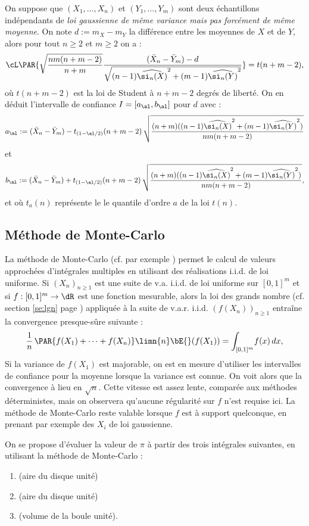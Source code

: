 On suppose que $(X_1,\ldots,X_n)$ et $(Y_1,\ldots,Y_m)$ sont deux échantillons
indépendants de \emph{loi gaussienne de même variance mais pas forcément de
  même moyenne}. On note $d:=m_X-m_Y$ la différence entre les moyennes de $X$
et de $Y$, alors pour tout $n \geq 2$ et $m \geq 2$ on a :
$$ 
\cL\PAR{
\sqrt{\frac{nm(n+m-2)}{n+m}} 
\frac{(\bar{X}_n-\bar{Y}_m)-d}
{\sqrt{(n-1)\widehat{\si_n(X)}^2+(m-1)\widehat{\si_n(Y)}^2}}}
=t(n+m-2),
$$
où $t(n+m-2)$ est la loi de Student à $n+m-2$ degrés de liberté. On en
déduit l'intervalle de confiance $I=[a_\al,b_\al]$ pour $d$ avec :
$$
a_\al:=(\bar{X}_n-\bar{Y}_m)-t_{(1-\al/2)}(n+m-2)\,
       \sqrt{\frac{(n+m)((n-1)\widehat{\si_n(X)}^2
                     +(m-1)\widehat{\si_n(Y)}^2)}{nm(n+m-2)}}
$$
et
$$
b_\al:=(\bar{X}_n -\bar{Y}_m)+t_{(1-\al/2)}(n+m-2)\,
       \sqrt{\frac{(n+m)((n-1)\widehat{\si_n(X)}^2
                   +(m-1)\widehat{\si_n(Y)}^2)}{nm(n+m-2)}},
$$
et où $t_a(n)$ représente le le quantile d'ordre $a$ de la loi $t(n)$.


%
\subsection{Méthode de Monte-Carlo}\label{ss:mc}
%

La méthode de Monte-Carlo (cf. par exemple \cite[p. 103]{dacunha-castelle-duflo})
permet le calcul de valeurs approchées d'intégrales multiples en utilisant des
réalisations i.i.d. de loi uniforme. Si $(X_n)_{n\geq 1}$ est une suite de
v.a. i.i.d. de loi uniforme sur $[0,1]^m$ et si $f:[0,1]^m\to\dR$ est une
fonction mesurable, alors la loi des grands nombre (cf. section \ref{se:lgn}
page \pageref{se:lgn}) appliquée à la suite de v.a.r. i.i.d. $(f(X_n))_{n\geq
  1}$ entraîne la convergence presque-sûre suivante :
$$
\frac{1}{n}\,\PAR{f(X_1)+\cdots+f(X_n)}
\limn{n}
\bE{}(f(X_1))=\int_{[0,1]^m}\! f(x)\,dx,
$$
Si la variance de $f(X_1)$ est majorable, on est en mesure d'utiliser les
intervalles de confiance pour la moyenne lorsque la variance est connue. On
voit alors que la convergence à lieu en $\sqrt{n}$. Cette vitesse est assez
lente, comparée aux méthodes déterministes, mais on observera qu'aucune
régularité sur $f$ n'est requise ici. La méthode de Monte-Carlo reste valable
lorsque $f$ est à support quelconque, en prenant par exemple des $X_i$ de loi
gaussienne.

\begin{example}
  On se propose d'évaluer la valeur de $\pi$ à partir des trois intégrales
  suivantes, en utilisant la méthode de Monte-Carlo :
\begin{enumerate}
\item {} \quad (aire du disque unité)
\item {} \quad (aire du disque unité)
\item {} \quad (volume de la boule
  unité).
\end{enumerate}
%
%
%
\end{example}

